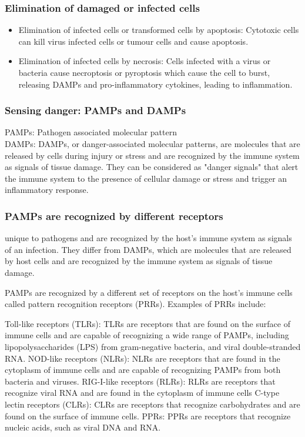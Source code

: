 \begin{itemize}
\begin{itemize}
\subsubsection{Elimination of damaged or infected cells}
\begin{itemize}
    \item Elimination of infected cells or transformed cells by apoptosis: Cytotoxic cells can kill virus infected cells or tumour cells and cause apoptosis.
    \item Elimination of infected cells by necrosis: Cells infected with a virus or bacteria cause necroptosis or pyroptosis which cause the cell to burst, releasing DAMPs and pro-inflammatory cytokines, leading to inflammation.
\end{itemize}

\subsubsection{Sensing danger: PAMPs and DAMPs}
PAMPs: Pathogen associated molecular pattern
\\DAMPs: DAMPs, or danger-associated molecular patterns, are molecules that are released by cells during injury or stress and are recognized by the immune system as signals of tissue damage. They can be considered as "danger signals" that alert the immune system to the presence of cellular damage or stress and trigger an inflammatory response.

\subsubsection{PAMPs are recognized by different receptors}
unique to pathogens and are recognized by the host's immune system as signals of an infection. They differ from DAMPs, which are molecules that are released by host cells and are recognized by the immune system as signals of tissue damage.

PAMPs are recognized by a different set of receptors on the host's immune cells called pattern recognition receptors (PRRs). Examples of PRRs include:

Toll-like receptors (TLRs): TLRs are receptors that are found on the surface of immune cells and are capable of recognizing a wide range of PAMPs, including lipopolysaccharides (LPS) from gram-negative bacteria, and viral double-stranded RNA.
NOD-like receptors (NLRs): NLRs are receptors that are found in the cytoplasm of immune cells and are capable of recognizing PAMPs from both bacteria and viruses.
RIG-I-like receptors (RLRs): RLRs are receptors that recognize viral RNA and are found in the cytoplasm of immune cells
C-type lectin receptors (CLRs): CLRs are receptors that recognize carbohydrates and are found on the surface of immune cells.
PPRs: PPRs are receptors that recognize nucleic acids, such as viral DNA and RNA.

\end{itemize}
\end{itemize}

